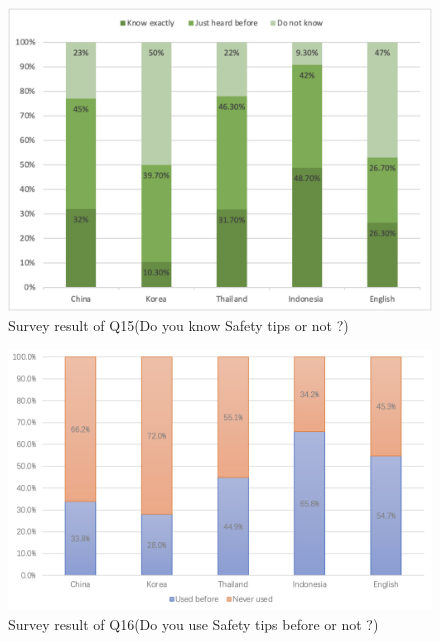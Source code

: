 \begin{figure}[h]
  \includegraphics[width=0.8\linewidth]{Figure/Figure13.jpg}
  \centering
  \caption[Survey result of Q15]{Survey result of Q15(Do you know Safety tips or not ?)}
  \label{fig13}
\end{figure}

\begin{figure}[h]
  \includegraphics[width=0.8\linewidth]{Figure/Figure14.jpg}
  \centering
  \caption[Survey result of Q16]{Survey result of Q16(Do you use Safety tips before or not ?)}
  \label{fig14}
\end{figure}

